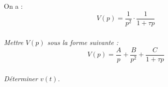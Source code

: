 \documentclass[10pt]{article}
\newif\ifprof
\begin{document}
\vspace{.25cm}

On a :
$$V(p) = \dfrac{1}{p^2} \cdot \dfrac{1}{1+\tau p}$$


\subparagraph{}
\textit{Mettre $V(p)$ sous la forme suivante : }
$$
V(p)=\dfrac{A}{p}+\dfrac{B}{p^2} +\dfrac{C}{1+\tau p}
$$

\ifprof
\begin{corrige}

En multipliant par $p^2$ et en posant $p=0$ on trouve $B=1$.

En multipliant par $1+\tau p$ et en posant $p=-\dfrac{1}{\tau}$ on trouve $C=\tau^2$.

En $p=1$ on a : $\dfrac{1}{1+\tau} = A+1+\dfrac{\tau^2}{1+\tau} \Longleftrightarrow A = \dfrac{1}{1+\tau}-1-\dfrac{\tau^2}{1+\tau} = -\tau$.


\end{corrige}
\else
\fi



\subparagraph{}
\textit{Déterminer $v(t)$.}
\ifprof
\begin{corrige}
On a donc, $\forall t>0$ : 
$$
v(t)=u(t)\cdot \left(-\tau+t+\tau e^{-\dfrac{t}{\tau}}\right)
$$
\end{corrige}
\else
\fi
\end{document}
